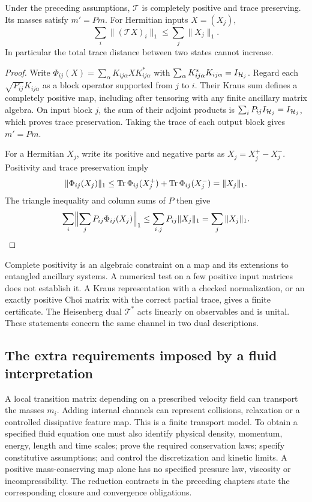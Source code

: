 \begin{proposition}
\label{prop:qtf-channel-transport}
Under the preceding assumptions, $\mathcal T$ is completely positive and
trace preserving. Its masses satisfy $m'=Pm$. For Hermitian inputs
$X=(X_j)$,
\[
 \sum_i\|(\mathcal TX)_i\|_1\le\sum_j\|X_j\|_1.
\]
In particular the total trace distance between two states cannot increase.
\end{proposition}
\begin{proof}
Write $\Phi_{ij}(X)=\sum_\alpha K_{ij\alpha}XK_{ij\alpha}^*$ with
$\sum_\alpha K_{ij\alpha}^*K_{ij\alpha}=I_{\mathcal{H}_j}$. Regard each
$\sqrt{P_{ij}}K_{ij\alpha}$ as a block operator supported from $j$ to
$i$. Their Kraus sum defines a completely positive map, including after
tensoring with any finite ancillary matrix algebra. On input block $j$,
the sum of their adjoint products is
$\sum_iP_{ij}I_{\mathcal{H}_j}=I_{\mathcal{H}_j}$, which proves trace preservation.
Taking the trace of each output block gives $m'=Pm$.

For a Hermitian $X_j$, write its positive and negative parts as
$X_j=X_j^+-X_j^-$. Positivity and trace preservation imply
\[
 \|\Phi_{ij}(X_j)\|_1
 \le\operatorname{Tr}\Phi_{ij}(X_j^+)+\operatorname{Tr}\Phi_{ij}(X_j^-)
 =\|X_j\|_1.
\]
The triangle inequality and column sums of $P$ then give
\[
 \sum_i\Bigl\|\sum_jP_{ij}\Phi_{ij}(X_j)\Bigr\|_1
 \le\sum_{i,j}P_{ij}\|X_j\|_1
 =\sum_j\|X_j\|_1.
\]
\end{proof}

Complete positivity is an algebraic constraint on a map and its extensions
to entangled ancillary systems. A numerical test on a few positive input
matrices does not establish it. A Kraus representation with a checked
normalization, or an exactly positive Choi matrix with the correct partial
trace, gives a finite certificate. The Heisenberg dual $\mathcal T^*$ acts
linearly on observables and is unital. These statements concern the same
channel in two dual descriptions.

\subsection{The extra requirements imposed by a fluid interpretation}

A local transition matrix depending on a prescribed velocity field can
transport the masses $m_i$. Adding internal channels can represent
collisions, relaxation or a controlled dissipative feature map. This is a
finite transport model. To obtain a specified fluid equation one must also
identify physical density, momentum, energy, length and time scales; prove
the required conservation laws; specify constitutive assumptions; and
control the discretization and kinetic limits. A positive mass-conserving
map alone has no specified pressure law, viscosity or incompressibility.
The reduction contracts in the preceding chapters state the corresponding
closure and convergence obligations.

